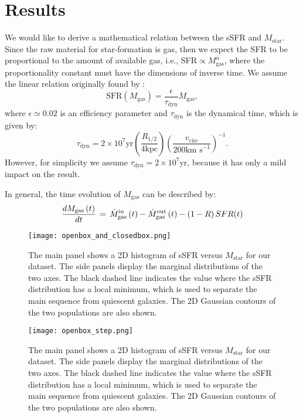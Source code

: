 \documentclass[fleqn,usenatbib]{mnras}
\begin{document}
\section{Results}\label{sec:results}
We would like to derive a mathematical relation between the sSFR and $M_\text{star}$. Since the raw material for star-formation is gas, then we expect the SFR to be proportional to the amount of available gas, i.e., SFR$\propto M_\text{gas}^\alpha$, where the proportionality constant must have the dimensions of inverse time. We assume the linear relation originally found by \citet{Kennicutt_1998}:
\begin{equation}
    \text{SFR}\left(M_\text{gas}\right) = \dfrac{\epsilon}{\tau_\text{dyn}} M_\text{gas},
	\label{eq:SFR_vs_gasmass}
\end{equation}
where $\epsilon \simeq 0.02$ is an efficiency parameter and $\tau_\text{dyn}$ is the dynamical time, which is given by:
\begin{equation}
    \tau_\text{dyn} = 2 \times 10^7 \text{yr} \left(\dfrac{R_{1\slash2}}{4\text{kpc}}\right) \left(\dfrac{v_\text{circ}}{200\text{km s}^{-1}}\right)^{-1}.
	\label{eq:t_dynamical}
\end{equation}
However, for simplicity we assume $\tau_\text{dyn} = 2 \times 10^7 \text{yr}$, because it has only a mild impact on the result.

In general, the time evolution of $M_\text{gas}$ can be described by:
\begin{equation}
    \dfrac{dM_{\rm gas}\left(t\right)}{dt} \, = \, \dot{M}_{\rm gas}^{\rm in}\left(t\right) - \dot{M}_{\rm gas}^{\rm out}\left(t\right) - \left(1-R\right)SFR(t)
	\label{eq:dmgass_dt}
\end{equation}


\begin{figure}
    \begin{centering}
	\texttt{[image: openbox\_and\_closedbox.png]}
    \caption{The main panel shows a 2D histogram of sSFR versus $M_{\text{star}}$ for our dataset. The side panels display the marginal distributions of the two axes. The black dashed line indicates the value where the sSFR distribution has a local minimum, which is used to separate the main sequence from quiescent galaxies. The 2D Gaussian contours of the two populations are also shown.}
    \end{centering}
    \label{fig:openbox_and_closedbox}
\end{figure}

\begin{figure}
    \begin{centering}
	\texttt{[image: openbox\_step.png]}
    \caption{The main panel shows a 2D histogram of sSFR versus $M_{\text{star}}$ for our dataset. The side panels display the marginal distributions of the two axes. The black dashed line indicates the value where the sSFR distribution has a local minimum, which is used to separate the main sequence from quiescent galaxies. The 2D Gaussian contours of the two populations are also shown.}
    \end{centering}
    \label{fig:openbox_step}
\end{figure}
\end{document}
